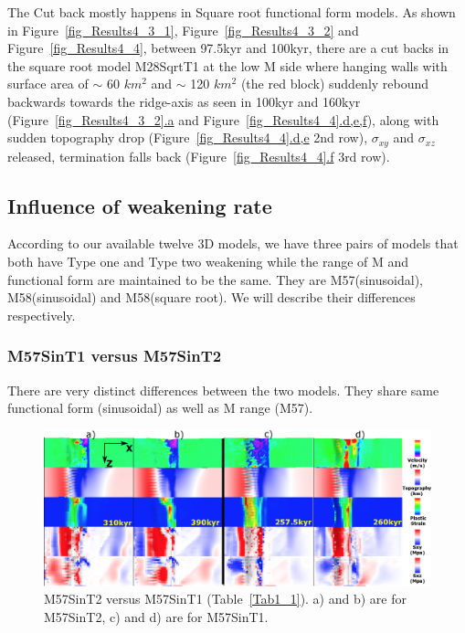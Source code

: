 The Cut back mostly happens in Square root functional form models. As shown in Figure~\hyperref[fig_Results4_3_1]{\ref{fig_Results4_3_1}}, Figure~\hyperref[fig_Results4_3_1]{\ref{fig_Results4_3_2}} and Figure~\hyperref[fig_Results4_4]{\ref{fig_Results4_4}}, between 97.5kyr and 100kyr, there are a cut backs in the square root model M28SqrtT1 at the low M side where hanging walls with surface area of $\sim$ 60 $km^{2}$ and $\sim$ 120 $km^{2}$ (the red block) suddenly rebound backwards towards the ridge-axis as seen in 100kyr and 160kyr (Figure~\hyperref[fig_Results4_3_1]{\ref{fig_Results4_3_2}.a} and Figure~\hyperref[fig_Results4_4]{\ref{fig_Results4_4}.d,e,f}), along with sudden topography drop (Figure~\hyperref[fig_Results4_4]{\ref{fig_Results4_4}.d,e} 2nd row), $\sigma_{xy}$ and $\sigma_{xz}$ released, termination falls back (Figure~\hyperref[fig_Results4_4]{\ref{fig_Results4_4}.f} 3rd row). 

\subsection{Influence of weakening rate}

According to our available twelve 3D models, we have three pairs of models that both have Type one and Type two weakening while the range of M and functional form are maintained to be the same. They are M57(sinusoidal), M58(sinusoidal) and M58(square root). We will describe their differences respectively. 

\subsubsection{M57SinT1 versus M57SinT2}

There are very distinct differences between the two models. They share same functional form (sinusoidal) as well as M range (M57).

\begin{figure}[h]
 \centering
  \includegraphics[width=1.0\textwidth]{fig_Results_Weakening_2_M57SinT1VST2_CutbackVSsecondaryFault.eps}
 \caption{M57SinT2 versus M57SinT1 (Table~\hyperref[Tab1_1]{\ref{Tab1_1}}). a) and b) are for M57SinT2, c) and d) are for M57SinT1.}
\label{fig_Results_Weakenging_2}
\end{figure}

